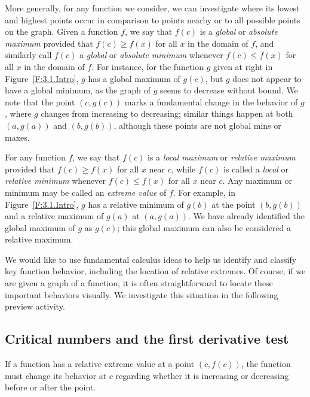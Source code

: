 More generally, for any function we consider, we can investigate where its lowest and highest points occur in comparison to points nearby or to all possible points on the graph.  Given a function $f$, we say that $f(c)$ is a \emph{global} or \emph{absolute maximum}    provided that $f(c) \ge f(x)$ for all $x$ in the domain of $f$, and similarly call $f(c)$ a \emph{global}  or \emph{absolute minimum}  whenever $f(c) \le f(x)$ for all $x$ in the domain of $f$.  For instance, for the function $g$ given at right in Figure~\ref{F:3.1.Intro}, $g$ has a global maximum of $g(c)$, but $g$ does not appear to have a global minimum, as the graph of $g$ seems to decrease without bound.  We note that the point $(c,g(c))$ marks a fundamental change in the behavior of $g$, where $g$ changes from increasing to decreasing; similar things happen at both $(a,g(a))$ and $(b,g(b))$, although these points are not global mins or maxes.  

For any function $f$, we say that $f(c)$ is a \emph{local maximum}  or \emph{relative maximum}  provided that $f(c) \ge f(x)$ for all $x$ near $c$, while $f(c)$ is called a \emph{local}  or \emph{relative minimum}  whenever $f(c) \le f(x)$ for all $x$ near $c$.  Any maximum or minimum may be called an \emph{extreme value}  of $f$.  For example, in Figure~\ref{F:3.1.Intro}, $g$ has a relative minimum of $g(b)$ at the point $(b,g(b))$ and a relative maximum of $g(a)$ at $(a,g(a))$.  We have already identified the global maximum of $g$ as $g(c)$; this global maximum can also be considered a relative maximum.  

We would like to use fundamental calculus ideas to help us identify and classify key function behavior, including the location of relative extremes.  Of course, if we are given a graph of a function, it is often straightforward to locate these important behaviors visually.  We investigate this situation in the following preview activity.



\subsection*{Critical numbers and the first derivative test}

If a function has a relative extreme value at a point $(c,f(c))$, the function must change its behavior at $c$ regarding whether it is increasing or decreasing before or after the point.

